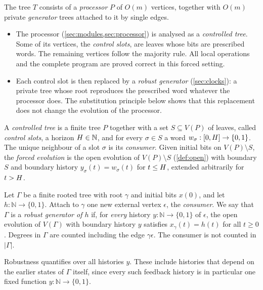 The tree $T$ consists of a \emph{processor} $P$ of $O(m)$ vertices, together with $O(m)$ private
\emph{generator} trees attached to it by single edges.
\begin{itemize}
\item The processor (\cref{sec:modules,sec:processor}) is analysed as a \emph{controlled tree}. Some
  of its vertices, the \emph{control slots}, are leaves whose bits are prescribed words. The
  remaining vertices follow the majority rule. All local operations and the complete program are
  proved correct in this forced setting.
\item Each control slot is then replaced by a \emph{robust generator} (\cref{sec:clocks}): a private
  tree whose root reproduces the prescribed word whatever the processor does. The substitution
  principle below shows that this replacement does not change the evolution of the processor.
\end{itemize}

\begin{definition}\label{def:controlled}
A \emph{controlled tree} is a finite tree $P$ together with a set $S\subseteq V(P)$ of leaves,
called \emph{control slots}, a horizon $H\in\mathbb N$, and for every $\sigma\in S$ a word
$w_\sigma:[0,H]\to\{0,1\}$. The unique neighbour of a slot $\sigma$ is its \emph{consumer}. Given
initial bits on $V(P)\setminus S$, the \emph{forced evolution} is the open evolution of
$V(P)\setminus S$ (\cref{def:open}) with boundary $S$ and boundary history $y_\sigma(t)=w_\sigma(t)$
for $t\le H$, extended arbitrarily for $t>H$.
\end{definition}

\begin{definition}\label{def:robust}
Let $\Gamma$ be a finite rooted tree with root $\gamma$ and initial bits $x(0)$, and let
$h:\mathbb N\to\{0,1\}$. Attach to $\gamma$ one new external vertex $\epsilon$, the
\emph{consumer}. We say that $\Gamma$ is a \emph{robust generator of $h$} if, for \emph{every}
history $y:\mathbb N\to\{0,1\}$ of $\epsilon$, the open evolution of $V(\Gamma)$ with boundary
history $y$ satisfies $x_\gamma(t)=h(t)$ for all $t\ge 0$. Degrees in $\Gamma$ are counted including
the edge $\gamma\epsilon$. The consumer is not counted in $|\Gamma|$.
\end{definition}

Robustness quantifies over all histories $y$. These include histories that depend on the earlier
states of $\Gamma$ itself, since every such feedback history is in particular one fixed function
$y:\mathbb N\to\{0,1\}$.

